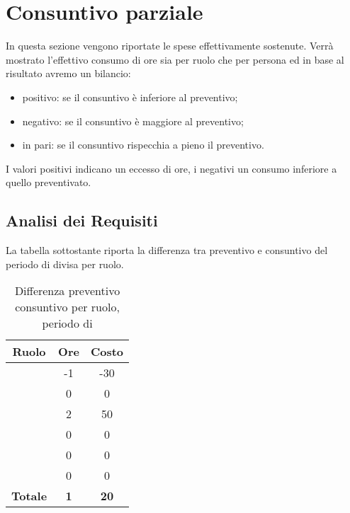 \section{Consuntivo parziale}
In questa sezione vengono riportate le spese effettivamente sostenute. Verrà mostrato l'effettivo consumo di ore sia per ruolo che per persona ed in base al risultato avremo un bilancio:
\begin{itemize}
	\item positivo: se il consuntivo è inferiore al preventivo;
	\item negativo: se il consuntivo è maggiore al preventivo;
	\item in pari: se il consuntivo rispecchia a pieno il preventivo.
\end{itemize}
I valori positivi indicano un eccesso di ore, i negativi un consumo inferiore a quello preventivato.

\subsection{Analisi dei Requisiti}
La tabella sottostante riporta la differenza tra preventivo e consuntivo del periodo di \AR{} divisa per ruolo.
\begin{table}[H]
	\centering
	\begin{tabular}{|c|c|c|}
		\hline
		\textbf{Ruolo} &
		\textbf{Ore} &
		\textbf{Costo} \\
		\hline
		\Responsabile & -1 & -30\\
		\hline
		\Amministratore & 0 & 0\\
		\hline
		\Analista & 2 & 50\\
		\hline
		\Progettista & 0 & 0 \\
		\hline
		\Verificatore & 0 & 0\\
		\hline
		\Programmatore & 0 & 0 \\
		\hline
		\textbf{Totale} & \textbf{1} & \textbf{20} \\
		\hline
	\end{tabular}
	\caption{Differenza preventivo consuntivo per ruolo, periodo di \AR}
\end{table}

